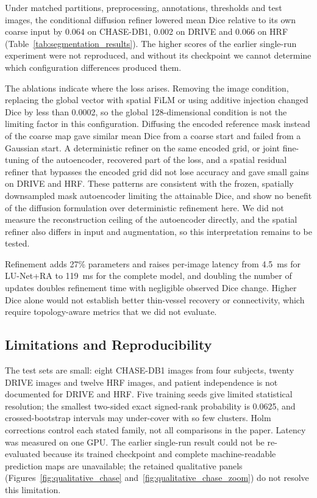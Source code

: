 \documentclass[jimaging,article,submit,pdftex,moreauthors]
  {Definitions/mdpi}
\newcommand{\revbegin}{\begingroup\color{blue}}
\newcommand{\revbegin}{\begingroup}
\newcommand{\revend}{\ifhmode\par\fi\endgroup}
\providecommand{\linelabel}[1]{}
\newcommand{\seclabel}[1]{\linelabel{rev:sec:#1}}
\newcommand{\secend}[1]{\linelabel{rev:end:#1}}
\begin{document}
\revbegin{}Under matched partitions, preprocessing, annotations, thresholds and test images, the conditional diffusion refiner lowered mean Dice relative to its own coarse input by 0.064 on CHASE-DB1, 0.002 on DRIVE and 0.066 on HRF (Table~\ref{tab:segmentation_results}). The higher scores of the earlier single-run experiment were not reproduced, and without its checkpoint we cannot determine which configuration differences produced them.

The ablations indicate where the loss arises. Removing the image condition, replacing the global vector with spatial FiLM or using additive injection changed Dice by less than 0.0002, so the global 128-dimensional condition is not the limiting factor in this configuration. Diffusing the encoded reference mask instead of the coarse map gave similar mean Dice from a coarse start and failed from a Gaussian start. A deterministic refiner on the same encoded grid, or joint fine-tuning of the autoencoder, recovered part of the loss, and a spatial residual refiner that bypasses the encoded grid did not lose accuracy and gave small gains on DRIVE and HRF. These patterns are consistent with the frozen, spatially downsampled mask autoencoder limiting the attainable Dice, and show no benefit of the diffusion formulation over deterministic refinement here. We did not measure the reconstruction ceiling of the autoencoder directly, and the spatial refiner also differs in input and augmentation, so this interpretation remains to be tested.

Refinement adds 27\% parameters and raises per-image latency from 4.5~ms for LU-Net+RA to 119~ms for the complete model, and doubling the number of updates doubles refinement time with negligible observed Dice change. Higher Dice alone would not establish better thin-vessel recovery or connectivity, which require topology-aware metrics that we did not evaluate.\secend{discussion}\revend{}

\subsection{Limitations and Reproducibility}
\label{sec:limitations}
\seclabel{limitations}

\revbegin{}The test sets are small: eight CHASE-DB1 images from four subjects, twenty DRIVE images and twelve HRF images, and patient independence is not documented for DRIVE and HRF. Five training seeds give limited statistical resolution; the smallest two-sided exact signed-rank probability is 0.0625, and crossed-bootstrap intervals may under-cover with so few clusters. Holm corrections control each stated family, not all comparisons in the paper. Latency was measured on one GPU. The earlier single-run result could not be re-evaluated because its trained checkpoint and complete machine-readable prediction maps are unavailable; the retained qualitative panels (Figures~\ref{fig:qualitative_chase} and~\ref{fig:qualitative_chase_zoom}) do not resolve this limitation.\revend{}
\end{document}
